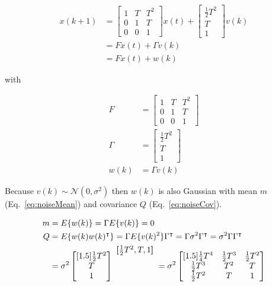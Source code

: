 \documentclass{article}
\newenvironment{rowvector}
 {\bm{[}\begin{matrix}}
 {\end{matrix}\bm{]}}
\begin{document}
\begin{align}
    x(k+1)&=\begin{bmatrix}
        1 & T & T^2\\
        0 & 1 & T\\
        0 & 0 & 1
           \end{bmatrix}
           x(t)+
           \begin{bmatrix}
               \frac{1}{2}T^2\\
               T\\
               1
           \end{bmatrix}
           v(k)\nonumber\\
           &=Fx(t)+\Gamma v(k)\nonumber\\
           &=Fx(t)+w(k)\label{eq:DWPAmodel}
\end{align}

\noindent with 

\begin{align}
    F&=\begin{bmatrix}
          1 & T & T^2\\
          0 & 1 & T\\
          0 & 0 & 1
       \end{bmatrix}\nonumber\\
    \Gamma&=\begin{bmatrix}
               \frac{1}{2}T^2\\
               T\\
               1
            \end{bmatrix}\nonumber\\
    w(k)&=\Gamma v(k)\nonumber
\end{align}

Because $v(k)\sim\mathcal{N}(0,\sigma^2)$ then $w(k)$ is also Gaussian with
mean $m$ (Eq.~\ref{eq:noiseMean}) and covariance $Q$ (Eq.~\ref{eq:noiseCov}).

\begin{align}
    m&=E\{w(k)\}=\Gamma E\{v(k)\}=0\label{eq:noiseMean}\\
    Q&=E\{w(k)w(k)^\intercal\}=\Gamma
    E\{v(k)^2\}\Gamma^\intercal=\Gamma\sigma^2\Gamma^\intercal=\sigma^2\Gamma\Gamma^\intercal\nonumber\\
     &=\sigma^2\begin{bmatrix}[1.5]
                 \frac{1}{2}T^2\\
                 T\\
                 1
       \end{bmatrix}
     \raisebox{4.5ex}{
         $\begin{rowvector}\frac{1}{2}T^2, T, 1\end{rowvector}$
     }=\sigma^2\begin{bmatrix}[1.5]
                   \frac{1}{4}T^4&\frac{1}{2}T^3&\frac{1}{2}T^2\\
                   \frac{1}{2}T^3&T^2&T\\
                   \frac{1}{2}T^2&T&1
                \end{bmatrix}\label{eq:noiseCov}
\end{align}
\end{document}
